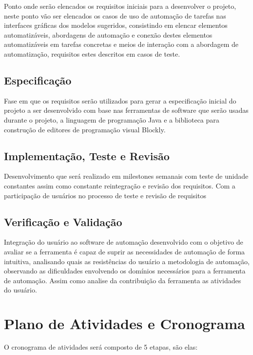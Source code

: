 \documentclass[12pt]{article}
\begin{document}
	 Ponto onde serão elencados os requisitos iniciais para a desenvolver o projeto, neste ponto vão ser elencados os casos de uso de automação de tarefas nas interfaces gráficas dos modelos sugeridos, consistindo em elencar elementos automatizáveis, abordagens de automação e conexão destes elementos automatizáveis em tarefas concretas e meios de interação com a abordagem de automatização, requisitos estes descritos em casos de teste. 
	
	\subsection{Especificação}
	Fase em que os requisitos serão utilizados para gerar a especificação inicial do projeto a ser desenvolvido com base nas ferramentas de software que serão usadas durante o projeto, a linguagem de programação Java e a biblioteca para construção de editores de programação visual Blockly.
	
	
	\subsection{Implementação, Teste e Revisão}
	
	Desenvolvimento que será realizado em milestones semanais com teste de unidade constantes assim como constante reintegração e revisão dos requisitos. Com a participação de usuários no processo de teste e revisão de requisitos     
    
    
    \subsection{Verificação e Validação}
    
    Integração do usuário ao software de automação desenvolvido com o objetivo de avaliar se a ferramenta é capaz de suprir as necessidades de automação de forma intuitiva, analisando quais as resistências do usuário a metodologia de automação, observando as dificuldades envolvendo os domínios necessários para a ferramenta de automação. Assim como analise da contribuição da ferramenta as atividades do usuário. 

	\section{Plano de Atividades e Cronograma}
	
	O cronograma de atividades será composto de 5 etapas, são elas:
	
\end{document}

